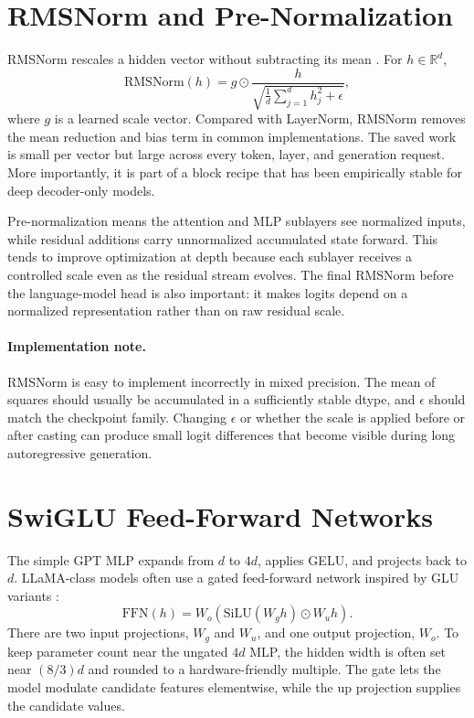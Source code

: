 \section{RMSNorm and Pre-Normalization}
\label{sec:llama-rmsnorm-prenorm}

RMSNorm rescales a hidden vector without subtracting its mean \cite{zhang2019root}. For $h\in\mathbb{R}^{d}$,
\begin{equation}
  \mathrm{RMSNorm}(h)
  = g \odot
    \frac{h}{\sqrt{\frac{1}{d}\sum_{j=1}^{d}h_j^2+\epsilon}},
  \label{eq:rmsnorm-llama}
\end{equation}
where $g$ is a learned scale vector. Compared with LayerNorm, RMSNorm removes the mean reduction and bias term in common implementations. The saved work is small per vector but large across every token, layer, and generation request. More importantly, it is part of a block recipe that has been empirically stable for deep decoder-only models.

Pre-normalization means the attention and MLP sublayers see normalized inputs, while residual additions carry unnormalized accumulated state forward. This tends to improve optimization at depth because each sublayer receives a controlled scale even as the residual stream evolves. The final RMSNorm before the language-model head is also important: it makes logits depend on a normalized representation rather than on raw residual scale.

\paragraph{Implementation note.}
RMSNorm is easy to implement incorrectly in mixed precision. The mean of squares should usually be accumulated in a sufficiently stable dtype, and $\epsilon$ should match the checkpoint family. Changing $\epsilon$ or whether the scale is applied before or after casting can produce small logit differences that become visible during long autoregressive generation.

\section{SwiGLU Feed-Forward Networks}
\label{sec:llama-swiglu}

The simple GPT MLP expands from $d$ to $4d$, applies GELU, and projects back to $d$. LLaMA-class models often use a gated feed-forward network inspired by GLU variants \cite{shazeer2020glu}:
\begin{equation}
  \mathrm{FFN}(h)
  = W_o(\mathrm{SiLU}(W_g h) \odot W_u h).
  \label{eq:swiglu-llama}
\end{equation}
There are two input projections, $W_g$ and $W_u$, and one output projection, $W_o$. To keep parameter count near the ungated $4d$ MLP, the hidden width is often set near $(8/3)d$ and rounded to a hardware-friendly multiple. The gate lets the model modulate candidate features elementwise, while the up projection supplies the candidate values.

